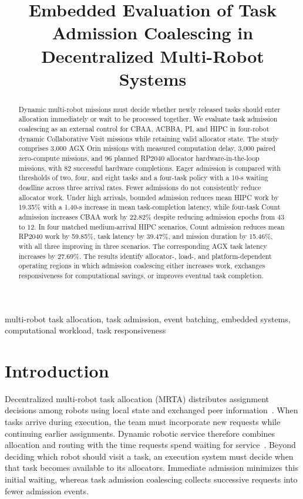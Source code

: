 \documentclass[conference]{IEEEtran}
\title{Embedded Evaluation of Task Admission Coalescing in Decentralized Multi-Robot Systems}
\author{%
\IEEEauthorblockN{James Lott and Vahraz Honary}
\IEEEauthorblockA{Department of Electrical Engineering\\
University of San Diego\\
San Diego, California, USA\\
\{jlott,vhonary\}@sandiego.edu}}
\begin{document}
\maketitle

\begin{abstract}
Dynamic multi-robot missions must decide whether newly released tasks should enter allocation immediately or wait to be processed together. We evaluate task admission coalescing as an external control for CBAA, ACBBA, PI, and HIPC in four-robot dynamic Collaborative Visit missions while retaining valid allocator state. The study comprises 3,000 AGX Orin missions with measured computation delay, 3,000 paired zero-compute missions, and 96 planned RP2040 allocator hardware-in-the-loop missions, with 82 successful hardware completions. Eager admission is compared with thresholds of two, four, and eight tasks and a four-task policy with a 10-s waiting deadline across three arrival rates. Fewer admissions do not consistently reduce allocator work. Under high arrivals, bounded admission reduces mean HIPC work by 19.35\% with a 1.40-s increase in mean task-completion latency, while four-task Count admission increases CBAA work by 22.82\% despite reducing admission epochs from 43 to 12. In four matched medium-arrival HIPC scenarios, Count admission reduces mean RP2040 work by 59.85\%, task latency by 39.47\%, and mission duration by 15.46\%, with all three improving in three scenarios. The corresponding AGX task latency increases by 27.69\%. The results identify allocator-, load-, and platform-dependent operating regions in which admission coalescing either increases work, exchanges responsiveness for computational savings, or improves eventual task completion.
\end{abstract}

\begin{IEEEkeywords}
multi-robot task allocation, task admission, event batching, embedded systems, computational workload, task responsiveness
\end{IEEEkeywords}

\section{Introduction}
\label{sec:introduction}
Decentralized multi-robot task allocation (MRTA) distributes assignment decisions among robots using local state and exchanged peer information~\cite{choi2009consensus,johnson2010asynchronous}. When tasks arrive during execution, the team must incorporate new requests while continuing earlier assignments. Dynamic robotic service therefore combines allocation and routing with the time requests spend waiting for service~\cite{pavone2011adaptive}. Beyond deciding which robot should visit a task, an execution system must decide when that task becomes available to its allocators. Immediate admission minimizes this initial waiting, whereas task admission coalescing collects successive requests into fewer admission events.
\end{document}
